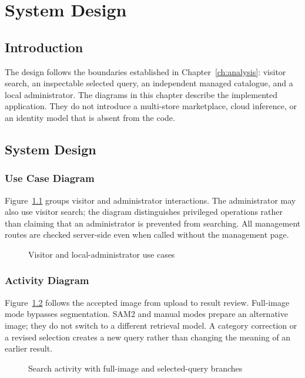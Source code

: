\chapter{System Design}
\label{ch:design}

\section{Introduction}
The design follows the boundaries established in Chapter~\ref{ch:analysis}:
visitor search, an inspectable selected query, an independent managed catalogue,
and a local administrator. The diagrams in this chapter describe the implemented
application. They do not introduce a multi-store marketplace, cloud inference,
or an identity model that is absent from the code.

\section{System Design}
\subsection{Use Case Diagram}
Figure~\ref{fig:usecases} groups visitor and administrator interactions. The
administrator may also use visitor search; the diagram distinguishes privileged
operations rather than claiming that an administrator is prevented from searching.
All management routes are checked server-side even when called without the
management page.

\begin{figure}[H]\centering
\caption{Visitor and local-administrator use cases}
\label{fig:usecases}\end{figure}

\subsection{Activity Diagram}
Figure~\ref{fig:search-activity} follows the accepted image from upload to result
review. Full-image mode bypasses segmentation. SAM2 and manual modes prepare
an alternative image; they do not switch to a different retrieval model. A
category correction or a revised selection creates a new query rather than
changing the meaning of an earlier result.

\begin{figure}[H]\centering
\caption{Search activity with full-image and selected-query branches}
\label{fig:search-activity}\end{figure}

